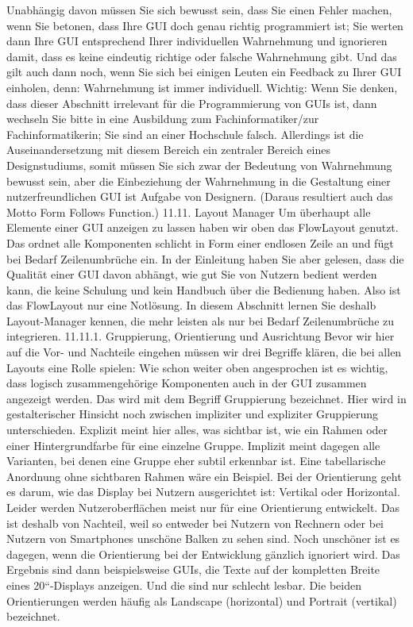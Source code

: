 Unabhängig davon müssen Sie sich bewusst sein, dass Sie einen Fehler machen, wenn Sie betonen, dass Ihre GUI doch genau richtig programmiert ist; Sie werten dann Ihre GUI entsprechend Ihrer individuellen Wahrnehmung und ignorieren damit, dass es keine eindeutig richtige oder falsche Wahrnehmung gibt. Und das gilt auch dann noch, wenn Sie sich bei einigen Leuten ein Feedback zu Ihrer GUI einholen, denn: Wahrnehmung ist immer individuell.
Wichtig: Wenn Sie denken, dass dieser Abschnitt irrelevant für die Programmierung von GUIs ist, dann wechseln Sie bitte in eine Ausbildung zum Fachinformatiker/zur Fachinformatikerin; Sie sind an einer Hochschule falsch. Allerdings ist die Auseinandersetzung mit diesem Bereich ein zentraler Bereich eines Designstudiums, somit müssen Sie sich zwar der Bedeutung von Wahrnehmung bewusst sein, aber die Einbeziehung der Wahrnehmung in die Gestaltung einer nutzerfreundlichen GUI ist Aufgabe von Designern. (Daraus resultiert auch das Motto Form Follows Function.)
11.11.	Layout Manager
Um überhaupt alle Elemente einer GUI anzeigen zu lassen haben wir oben das FlowLayout genutzt. Das ordnet alle Komponenten schlicht in Form einer endlosen Zeile an und fügt bei Bedarf Zeilenumbrüche ein. In der Einleitung haben Sie aber gelesen, dass die Qualität einer GUI davon abhängt, wie gut Sie von Nutzern bedient werden kann, die keine Schulung und kein Handbuch über die Bedienung haben. Also ist das FlowLayout nur eine Notlösung. In diesem Abschnitt lernen Sie deshalb Layout-Manager kennen, die mehr leisten als nur bei Bedarf Zeilenumbrüche zu integrieren.
11.11.1.	Gruppierung, Orientierung und Ausrichtung
Bevor wir hier auf die Vor- und Nachteile eingehen müssen wir drei Begriffe klären, die bei allen Layouts eine Rolle spielen:
Wie schon weiter oben angesprochen ist es wichtig, dass logisch zusammengehörige Komponenten auch in der GUI zusammen angezeigt werden. Das wird mit dem Begriff Gruppierung bezeichnet. Hier wird in gestalterischer Hinsicht noch zwischen impliziter und expliziter Gruppierung unterschieden. Explizit meint hier alles, was sichtbar ist, wie ein Rahmen oder einer Hintergrundfarbe für eine einzelne Gruppe. Implizit meint dagegen alle Varianten, bei denen eine Gruppe eher subtil erkennbar ist. Eine tabellarische Anordnung ohne sichtbaren Rahmen wäre ein Beispiel.
Bei der Orientierung geht es darum, wie das Display bei Nutzern ausgerichtet ist: Vertikal oder Horizontal. Leider werden Nutzeroberflächen meist nur für eine Orientierung entwickelt. Das ist deshalb von Nachteil, weil so entweder bei Nutzern von Rechnern oder bei Nutzern von Smartphones unschöne Balken zu sehen sind. Noch unschöner ist es dagegen, wenn die Orientierung bei der Entwicklung gänzlich ignoriert wird. Das Ergebnis sind dann beispielsweise GUIs, die Texte auf der kompletten Breite eines 20“-Displays anzeigen. Und die sind nur schlecht lesbar. Die beiden Orientierungen werden häufig als Landscape (horizontal) und Portrait (vertikal) bezeichnet.

